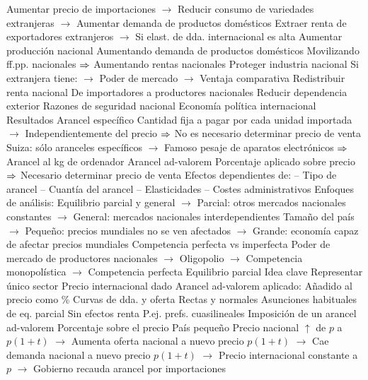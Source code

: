 \documentclass{nuevotema}
\begin{document}
\begin{esquemal}
				\4[] Aumentar precio de importaciones
				\4[] $\to$ Reducir consumo de variedades extranjeras
				\4[] $\to$ Aumentar demanda de productos domésticos
				\4[] Extraer renta de exportadores extranjeros
				\4[] $\to$ Si elast. de dda. internacional es alta
				\4 Aumentar producción nacional
				\4[] Aumentando demanda de productos domésticos
				\4[] Movilizando ff.pp. nacionales
				\4[] $\Rightarrow$ Aumentando rentas nacionales
				\4 Proteger industria nacional
				\4[] Si extranjera tiene:
				\4[] $\to$ Poder de mercado
				\4[] $\to$ Ventaja comparativa
				\4 Redistribuir renta nacional
				\4[] De importadores a productores nacionales
				\4 Reducir dependencia exterior
				\4[] Razones de seguridad nacional
				\4[] Economía política internacional
			\3 Resultados
				\4 Arancel específico
				\4[] Cantidad fija a pagar por cada unidad importada
				\4[] $\to$ Independientemente del precio
				\4[] $\Rightarrow$ No es necesario determinar precio de venta
				\4[] Suiza: sólo aranceles específicos
				\4[] $\to$ Famoso pesaje de aparatos electrónicos
				\4[] $\Rightarrow$ Arancel al kg de ordenador
				\4 Arancel ad-valorem
				\4[] Porcentaje aplicado sobre precio
				\4[] $\Rightarrow$ Necesario determinar precio de venta
				\4 Efectos dependientes de:
				\4[] -- Tipo de arancel
				\4[] -- Cuantía del arancel
				\4[] -- Elasticidades
				\4[] -- Costes administrativos
				\4 Enfoques de análisis:
				\4[] Equilibrio parcial y general
				\4[] $\to$ Parcial: otros mercados nacionales constantes
				\4[] $\to$ General: mercados nacionales interdependientes
				\4[] Tamaño del país
				\4[] $\to$ Pequeño: precios mundiales no se ven afectados
				\4[] $\to$ Grande: economía capaz de afectar precios mundiales
				\4 Competencia perfecta vs imperfecta
				\4[] Poder de mercado de productores nacionales
				\4[] $\to$ Oligopolio
				\4[] $\to$ Competencia monopolística
				\4[] $\to$ Competencia perfecta
		\2 Equilibrio parcial
			\3 Idea clave
				\4 Representar único sector
				\4 Precio internacional dado
				\4 Arancel ad-valorem aplicado:
				\4[] Añadido al precio como \%
				\4 Curvas de dda. y oferta
				\4[] Rectas y normales
				\4 Asunciones habituales de eq. parcial
				\4[] Sin efectos renta
				\4[] P.ej. prefs. cuasilineales
				\4 Imposición de un arancel ad-valorem
				\4[] Porcentaje sobre el precio
			\3 País pequeño
				\4 Precio nacional $\uparrow$ de $p$ a $p(1+t)$
				\4[] $\to$ Aumenta oferta nacional a nuevo precio $p(1+t)$
				\4[] $\to$ Cae demanda nacional a nuevo precio $p(1+t)$
				\4[] $\to$ Precio internacional constante a $p$
				\4[] $\to$ Gobierno recauda arancel por importaciones

\end{esquemal}
\end{document}
